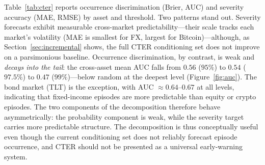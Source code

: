 \documentclass[11pt]{article}
\begin{document}
Table~\ref{tab:cter} reports occurrence discrimination (Brier, AUC) and severity accuracy (MAE, RMSE) by
asset and threshold. Two patterns stand out. Severity forecasts exhibit measurable cross-market
predictability---their scale tracks each market's volatility (MAE is smallest for FX, largest for
Bitcoin)---although, as Section~\ref{sec:incremental} shows, the full CTER conditioning set does not improve
on a parsimonious baseline. Occurrence discrimination, by contrast, is weak and \emph{decays into the tail}:
the cross-asset mean AUC falls from $0.56$ ($95\%$) to $0.54$ ($97.5\%$) to $0.47$ ($99\%$)---below random at
the deepest level (Figure~\ref{fig:auc}). The bond market (TLT) is the exception, with AUC $\approx0.64$--$0.67$
at all levels, indicating that fixed-income episodes are more predictable than equity or crypto episodes. The
two components of the decomposition therefore behave asymmetrically: the probability component is weak, while
the severity target carries more predictable structure. The decomposition is thus conceptually useful even
though the current conditioning set does not reliably forecast episode occurrence, and CTER should not be
presented as a universal early-warning system.
\end{document}
